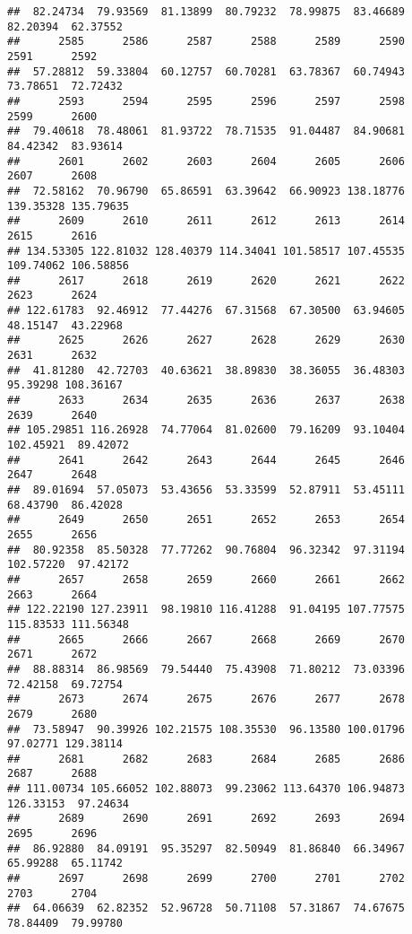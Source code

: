 \documentclass[
]{article}
\begin{document}
\begin{verbatim}
##  82.24734  79.93569  81.13899  80.79232  78.99875  83.46689  82.20394  62.37552 
##      2585      2586      2587      2588      2589      2590      2591      2592 
##  57.28812  59.33804  60.12757  60.70281  63.78367  60.74943  73.78651  72.72432 
##      2593      2594      2595      2596      2597      2598      2599      2600 
##  79.40618  78.48061  81.93722  78.71535  91.04487  84.90681  84.42342  83.93614 
##      2601      2602      2603      2604      2605      2606      2607      2608 
##  72.58162  70.96790  65.86591  63.39642  66.90923 138.18776 139.35328 135.79635 
##      2609      2610      2611      2612      2613      2614      2615      2616 
## 134.53305 122.81032 128.40379 114.34041 101.58517 107.45535 109.74062 106.58856 
##      2617      2618      2619      2620      2621      2622      2623      2624 
## 122.61783  92.46912  77.44276  67.31568  67.30500  63.94605  48.15147  43.22968 
##      2625      2626      2627      2628      2629      2630      2631      2632 
##  41.81280  42.72703  40.63621  38.89830  38.36055  36.48303  95.39298 108.36167 
##      2633      2634      2635      2636      2637      2638      2639      2640 
## 105.29851 116.26928  74.77064  81.02600  79.16209  93.10404 102.45921  89.42072 
##      2641      2642      2643      2644      2645      2646      2647      2648 
##  89.01694  57.05073  53.43656  53.33599  52.87911  53.45111  68.43790  86.42028 
##      2649      2650      2651      2652      2653      2654      2655      2656 
##  80.92358  85.50328  77.77262  90.76804  96.32342  97.31194 102.57220  97.42172 
##      2657      2658      2659      2660      2661      2662      2663      2664 
## 122.22190 127.23911  98.19810 116.41288  91.04195 107.77575 115.83533 111.56348 
##      2665      2666      2667      2668      2669      2670      2671      2672 
##  88.88314  86.98569  79.54440  75.43908  71.80212  73.03396  72.42158  69.72754 
##      2673      2674      2675      2676      2677      2678      2679      2680 
##  73.58947  90.39926 102.21575 108.35530  96.13580 100.01796  97.02771 129.38114 
##      2681      2682      2683      2684      2685      2686      2687      2688 
## 111.00734 105.66052 102.88073  99.23062 113.64370 106.94873 126.33153  97.24634 
##      2689      2690      2691      2692      2693      2694      2695      2696 
##  86.92880  84.09191  95.35297  82.50949  81.86840  66.34967  65.99288  65.11742 
##      2697      2698      2699      2700      2701      2702      2703      2704 
##  64.06639  62.82352  52.96728  50.71108  57.31867  74.67675  78.84409  79.99780 

\end{verbatim}
\end{document}
